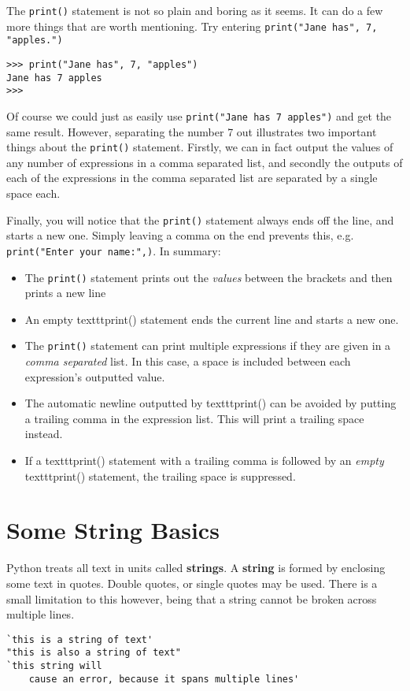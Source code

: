 The \texttt{print()} statement is not so plain and boring as it seems. It can   do a few more things that are worth mentioning. Try entering 
\texttt{print("Jane     has", 7, "apples.")}
\begin{lstlisting}
>>> print("Jane has", 7, "apples")
Jane has 7 apples
>>>
\end{lstlisting}

Of course we could just as easily use 
\texttt{print("Jane has 7   apples")} and get the same result. However, separating the number   7 out illustrates two important things about the \texttt{print()} statement.   Firstly, we can in fact output the values of any number of expressions   in a comma separated list, and secondly the outputs of each of the   expressions in the comma separated list are separated by a single space   each.

Finally, you will notice that the \texttt{print()} statement always ends off   the line, and starts a new one. Simply leaving a comma on the end   prevents this, e.g. 
\texttt{print("Enter your name:",)}. In summary:
\begin{itemize}
	\item The \texttt{print()} statement prints out the \textit{values}  between the     brackets and then prints a new line
	\item An empty texttt{print()} statement ends the current line and starts a new     one.
	\item The \texttt{print()} statement can print multiple expressions if they are     given in a \textit{comma separated} list. In this case, a space is     included between each expression's outputted value.
	\item The automatic newline outputted by texttt{print()} can be avoided by     putting a trailing comma in the expression list. This will print a     trailing space instead.
	\item If a texttt{print()} statement with a trailing comma is followed by an     \textit{empty} texttt{print()} statement, the trailing space is     suppressed.
\end{itemize}

\section{Some String Basics}

Python treats all text in units called \textbf{strings}. A \textbf{string} is formed   by enclosing some text in quotes. Double quotes, or single quotes may   be used. There is a small limitation to this however, being that a   string cannot be broken across multiple lines.
\begin{lstlisting}
`this is a string of text'
"this is also a string of text"
`this string will
    cause an error, because it spans multiple lines'
\end{lstlisting}

